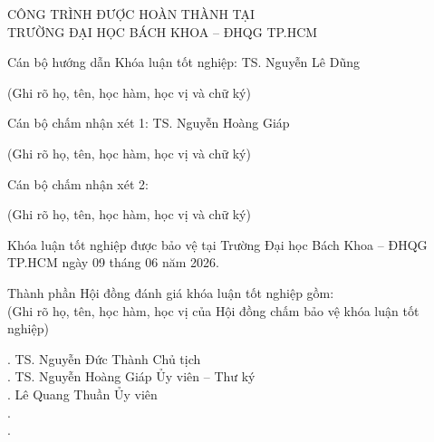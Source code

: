\documentclass[12pt,a4paper]{article}
\begin{document}
\pagestyle{empty}

\begin{center}
    CÔNG TRÌNH ĐƯỢC HOÀN THÀNH TẠI \\
    TRƯỜNG ĐẠI HỌC BÁCH KHOA -- ĐHQG TP.HCM
\end{center}

\vspace{0.5cm}

\noindent Cán bộ hướng dẫn Khóa luận tốt nghiệp: TS. Nguyễn Lê Dũng \dotfill \\
\vspace{-0.2cm}
\begin{center}
    (Ghi rõ họ, tên, học hàm, học vị và chữ ký)
\end{center}

\vspace{0.3cm}

\noindent Cán bộ chấm nhận xét 1: TS. Nguyễn Hoàng Giáp \dotfill \\
\vspace{-0.2cm}
\begin{center}
    (Ghi rõ họ, tên, học hàm, học vị và chữ ký)
\end{center}

\vspace{0.3cm}

\noindent Cán bộ chấm nhận xét 2: \dotfill \\
\vspace{-0.2cm}
\begin{center}
    (Ghi rõ họ, tên, học hàm, học vị và chữ ký)
\end{center}

\vspace{0.3cm}

\noindent Khóa luận tốt nghiệp được bảo vệ tại Trường Đại học Bách Khoa -- ĐHQG TP.HCM ngày 09 tháng 06 năm 2026.

\vspace{0.3cm}

\noindent Thành phần Hội đồng đánh giá khóa luận tốt nghiệp gồm: \\
(Ghi rõ họ, tên, học hàm, học vị của Hội đồng chấm bảo vệ khóa luận tốt nghiệp)

\vspace{0.2cm}
. TS. Nguyễn Đức Thành \dotfill Chủ tịch \\[0.2cm]
. TS. Nguyễn Hoàng Giáp \dotfill Ủy viên -- Thư ký \\[0.2cm]
. Lê Quang Thuần \dotfill Ủy viên \\[0.2cm]
. \dotfill \\[0.2cm]
. \dotfill
\end{document}
